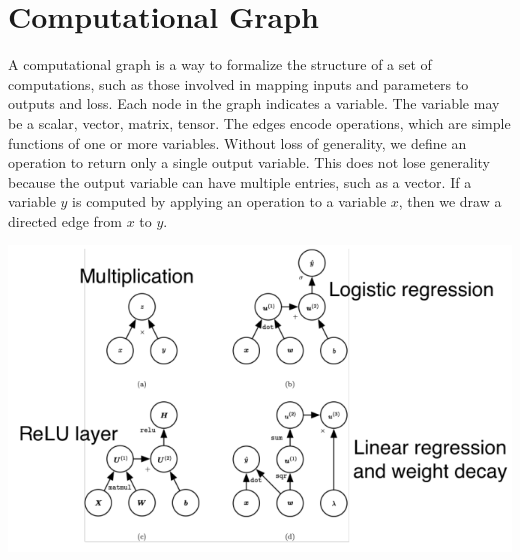 \section{Computational Graph}
A computational graph is a way to formalize the structure of a set of computations, such as those involved in mapping inputs and parameters to outputs and loss. Each node in the graph indicates a variable. The variable may be a scalar, vector, matrix, tensor. The edges encode operations, which are simple functions of one or more variables. Without loss of generality, we define an operation to return only a single output variable. This does not lose generality because the output variable can have multiple entries, such as a vector.\newline\newline
If a variable $y$ is computed by applying an operation to a variable $x$, then we draw a directed edge from $x$ to $y$.
\begin{center}
    \includegraphics[scale=0.7]{images/comp graph.png}
\end{center}
